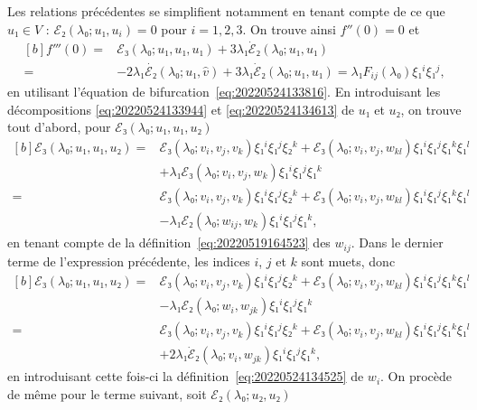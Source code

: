 \documentclass[12pt, final]{scrartcl}
\theoremstyle{definition}
\begin{document}
Les relations précédentes se simplifient notamment en tenant compte de ce que
\(u₁∈V\) : \(ℰ₂(λ₀; u₁, u_i) = 0\) pour \(i = 1, 2, 3\). On trouve ainsi
\(f''(0)=0\) et
\begin{equation}
  \begin{aligned}[b]
    \label{eq:20220601055448}
    f'''(0) ={} &
    ℰ₃(λ₀; u₁, u₁, u₁) + 3λ₁ \dot{ℰ}₂(λ₀; u₁, u₁)\\
    ={} & - 2λ₁ \dot{ℰ₂}(λ₀; u₁, \hat{v}) + 3λ₁ \dot{ℰ}₂(λ₀; u₁, u₁) = λ₁ F_{ij}(λ₀) ξ₁^i ξ₁^j,
  \end{aligned}
\end{equation}
en utilisant l'équation de bifurcation~\eqref{eq:20220524133816}. En
introduisant les décompositions \eqref{eq:20220524133944} et
\eqref{eq:20220524134613} de \(u₁\) et \(u₂\), on trouve tout d'abord, pour
\(ℰ₃(λ₀; u₁, u₁, u₂)\)
\begin{equation}
  \begin{aligned}[b]
    ℰ₃(λ₀; u₁, u₁, u₂)
    ={} & ℰ₃(λ₀ ; v_i, v_j, v_k) ξ₁^i ξ₁^j ξ₂^k + ℰ₃(λ₀; v_i, v_j, w_{k l}) ξ₁^i ξ₁^j ξ₁^k ξ₁^l\\
    & + λ₁ ℰ₃(λ₀; v_i, v_j, w_k) ξ₁^i ξ₁^j ξ₁^k\\
    ={} & ℰ₃(λ₀; v_i, v_j, v_k) ξ₁^i ξ₁^j ξ₂^k + ℰ₃(λ₀; v_i, v_j, w_{k l}) ξ₁^i ξ₁^j ξ₁^k ξ₁^l\\
    & - λ₁ ℰ₂(λ₀; w_{ij}, w_k) ξ₁^i ξ₁^j ξ₁^k,
  \end{aligned}
\end{equation}
en tenant compte de la définition~\eqref{eq:20220519164523} des \(w_{ij}\). Dans
le dernier terme de l'expression précédente, les indices \(i\), \(j\) et \(k\)
sont muets, donc
\begin{equation*}
  \begin{aligned}[b]
    ℰ₃(λ₀; u₁, u₁, u₂)
    ={} & ℰ₃(λ₀ ; v_i, v_j, v_k) ξ₁^i ξ₁^j ξ₂^k + ℰ₃(λ₀; v_i, v_j, w_{kl}) ξ₁^i ξ₁^j ξ₁^k ξ₁^l\\
    & - λ₁ ℰ₂(λ₀; w_{i}, w_{jk}) ξ₁^i ξ₁^j ξ₁^k\\
    ={} & ℰ₃(λ₀; v_i, v_j, v_k) ξ₁^i ξ₁^j ξ₂^k + ℰ₃(λ₀; v_i, v_j, w_{kl}) ξ₁^i ξ₁^j ξ₁^k ξ₁^l\\
    & + 2 λ₁ \dot{ℰ}₂(λ₀; v_{i}, w_{jk}) ξ₁^i ξ₁^j ξ₁^k,
  \end{aligned}
\end{equation*}
en introduisant cette fois-ci la définition~\eqref{eq:20220524134525} de
\(w_i\). On procède de même pour le terme suivant, soit \(ℰ₂(λ₀; u₂, u₂)\)
\end{document}
